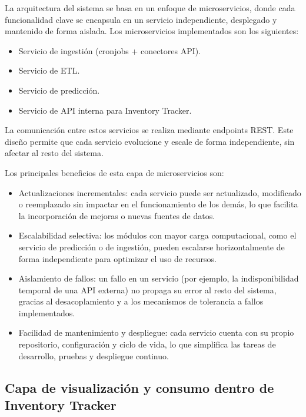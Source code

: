 La arquitectura del sistema se basa en un enfoque de microservicios, donde cada funcionalidad clave se encapsula en un servicio independiente, desplegado y mantenido de forma aislada. Los microservicios implementados son los siguientes:

\begin{itemize}
	\item Servicio de ingestión (cronjobs + conectores API).
	\item Servicio de ETL.
	\item Servicio de predicción.
	\item Servicio de API interna para Inventory Tracker.
\end{itemize}

La comunicación entre estos servicios se realiza mediante endpoints REST. Este diseño permite que cada servicio evolucione y escale de forma independiente, sin afectar al resto del sistema.


Los principales beneficios de esta capa de microservicios son:

\begin{itemize}
	\item Actualizaciones incrementales: cada servicio puede ser actualizado, modificado o reemplazado sin impactar en el funcionamiento de los demás, lo que facilita la incorporación de mejoras o nuevas fuentes de datos.

	\item Escalabilidad selectiva: los módulos con mayor carga computacional, como el servicio de predicción o de ingestión, pueden escalarse horizontalmente de forma independiente para optimizar el uso de recursos.

	\item Aislamiento de fallos: un fallo en un servicio (por ejemplo, la indisponibilidad temporal de una API externa) no propaga su error al resto del sistema, gracias al desacoplamiento y a los mecanismos de tolerancia a fallos implementados.

	\item Facilidad de mantenimiento y despliegue: cada servicio cuenta con su propio repositorio, configuración y ciclo de vida, lo que simplifica las tareas de desarrollo, pruebas y despliegue continuo.
	
\end{itemize}


\subsection{Capa de visualización y consumo dentro de Inventory Tracker}

